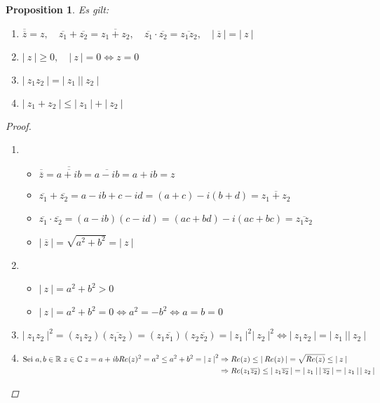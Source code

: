 \documentclass[a4paper,titlepage,oneside]{article}
\def\C{\ensuremath{\mathbb{C}} }
\def\R{\ensuremath{\mathbb{R}} }
\def\im{\ensuremath{\mathit{i}} }
\def\sp{\hspace{0,1cm}}
\newcommand{\abs}[1]{\ensuremath{\left|\:#1\:\right|}}
\theoremstyle{thmstyle}
\newtheorem{prop}[satz]{Proposition}
\theoremstyle{subthmstyle}
\begin{document}
\begin{prop}
Es gilt:
\begin{enumerate}[label=(\roman*)]
\item \( \overline{\overline{z}} = z, \quad \overline{z_1} + \overline{z_2} = \overline{z_1 + z_2}, \quad \overline{z_1} \cdot \overline{z_2} = \overline{z_1  z_2}, \quad \abs{\overline{z}} = \abs{z} \)
\item \( \abs{z} \ge 0, \quad \abs{z} = 0 \Leftrightarrow z = 0\)
\item \(\abs{z_1 z_2} = \abs{z_1} \abs{z_2}\)
\item \(\abs{z_1 + z_2} \le \abs{z_1} + \abs{z_2}\)
\end{enumerate}
\begin{proof} \sp
\begin{enumerate}[label=(\roman*)]
\item
\begin{itemize}
\item \(\overline{\overline{z}} = \overline{\overline{a + \im b}} = \overline{a - \im b} = a + \im b = z \)
\item \(\overline{z_1} + \overline{z_2} = a - \im b + c - \im d = (a + c) - \im (b + d) = \overline{z_1 + z_2} \)
\item \(\overline{z_1} \cdot \overline{z_2} = (a - \im b) (c - \im d) = (ac + bd) - \im (ac + bc) = \overline{z_1  z_2} \)
\item \( \abs{\overline{z}} = \sqrt{a^2 + b^2} = \abs{z}\)
\end{itemize}
\item
\begin{itemize}
\item \(\abs{z} = a^2 + b^2 > 0 \)
\item \(\abs{z} = a^2 + b^2 = 0 \Leftrightarrow a^2 = - b^2 \Leftrightarrow a = b = 0 \)
\end{itemize}
\item \(\abs{z_1 z_2}^2 = (z_1 z_2)(\overline{z_1 z_2}) = (z_1\overline{z_1})(z_2\overline{z_2}) = \abs{z_1}^2\abs{z_2}^2 \Leftrightarrow \abs{z_1 z_2} = \abs{z_1}\abs{z_2} \)
\item  \begin{math}
\text{Sei }a, b \in \R \sp z \in \C \sp z = a + \im b \\
\begin{aligned}[t]
Re(z)^2 = a^2 \le a^2 + b^2 = \abs{z}^2 &\Rightarrow Re(z) \le \abs{Re(z)} = \sqrt{Re(z)} \le \abs{z} \\
&\Rightarrow Re(z_1\overline{z_2}) \le \abs{z_1\overline{z_2}} = \abs{z_1}\abs{\overline{z_2}} = \abs{z_1}\abs{z_2} \\

\end{aligned}
\end{math}
\end{enumerate}
\end{proof}
\end{prop}
\end{document}
